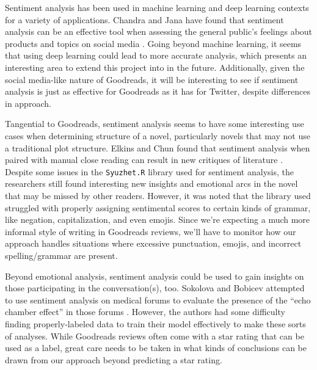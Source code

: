 Sentiment analysis has been used in machine learning and deep learning contexts for a variety of applications.
Chandra and Jana have found that sentiment analysis can be an effective tool when assessing the general public's
feelings about products and topics on social media \cite{chandra2020}. Going beyond machine learning, it seems
that using deep learning could lead to more accurate analysis, which presents an interesting area to extend
this project into in the future. Additionally, given the social media-like nature of Goodreads, it will be
interesting to see if sentiment analysis is just as effective for Goodreads as it has for Twitter, despite
differences in approach.

Tangential to Goodreads, sentiment analysis seems to have some interesting use cases when determining structure of
a novel, particularly novels that may not use a traditional plot structure. Elkins and Chun found that sentiment
analysis when paired with manual close reading can result in new critiques of literature \cite{Elkins2019}. Despite
some issues in the \texttt{Syuzhet.R} library used for sentiment analysis, the researchers still found interesting
new insights and emotional arcs in the novel that may be missed by other readers. However, it was noted that the
library used struggled with properly assigning sentimental scores to certain kinds of grammar, like negation,
capitalization, and even emojis. Since we're expecting a much more informal style of writing in Goodreads
reviews, we'll have to monitor how our approach handles situations where excessive punctuation, emojis, and
incorrect spelling/grammar are present.

Beyond emotional analysis, sentiment analysis could be used to gain insights on those participating in the
conversation(s), too. Sokolova and Bobicev attempted to use sentiment analysis on medical forums to evaluate
the presence of the ``echo chamber effect'' in those forums \cite{Sokolova2020}. However, the authors had some
difficulty finding properly-labeled data to train their model effectively to make these sorts of analyses.
While Goodreads reviews often come with a star rating that can be used as a label, great care needs to be
taken in what kinds of conclusions can be drawn from our approach beyond predicting a star rating.

